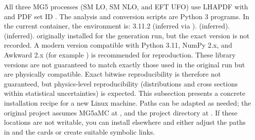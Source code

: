 \markdownRendererUlEnd \markdownRendererInterblockSeparator
{}All three MG5 processes (SM LO, SM NLO, and EFT UFO) use LHAPDF with  and PDF set ID .\markdownRendererInterblockSeparator
{}
\markdownRendererSectionEnd \markdownRendererSectionBegin
{}\markdownRendererInterblockSeparator
{}The analysis and conversion scripts are Python 3 programs. In the current container, the environment is:\markdownRendererInterblockSeparator
{}\markdownRendererUlBeginTight
\markdownRendererUlItem {} 3.11.2 (inferred via ).\markdownRendererUlItemEnd 
\markdownRendererUlItem {}  (inferred).\markdownRendererUlItemEnd 
\markdownRendererUlItem {}  (inferred).\markdownRendererUlItemEnd 
\markdownRendererUlItem {} originally installed for the generation run, but the exact version is not recorded. A modern version compatible with Python 3.11, NumPy 2.x, and Awkward 2.x (for example ) is recommended for reproduction.\markdownRendererUlItemEnd 
\markdownRendererUlEndTight \markdownRendererInterblockSeparator
{}These library versions are not guaranteed to match exactly those used in the original run but are physically compatible. Exact bitwise reproducibility is therefore not guaranteed, but physics-level reproducibility (distributions and cross sections within statistical uncertainties) is expected.\markdownRendererInterblockSeparator
{}
\markdownRendererSectionEnd \markdownRendererSectionBegin
{}\markdownRendererInterblockSeparator
{}This subsection presents a concrete installation recipe for a new Linux machine. Paths can be adapted as needed; the original project assumes\markdownRendererInterblockSeparator
{}\markdownRendererUlBeginTight
\markdownRendererUlItem MG5\markdownRendererUnderscore{}aMC at , and\markdownRendererUlItemEnd 
\markdownRendererUlItem the project directory at .\markdownRendererUlItemEnd 
\markdownRendererUlEndTight \markdownRendererInterblockSeparator
{}If these locations are not writable, you can install elsewhere and either adjust the paths in  and the  cards or create suitable symbolic links.\markdownRendererInterblockSeparator
